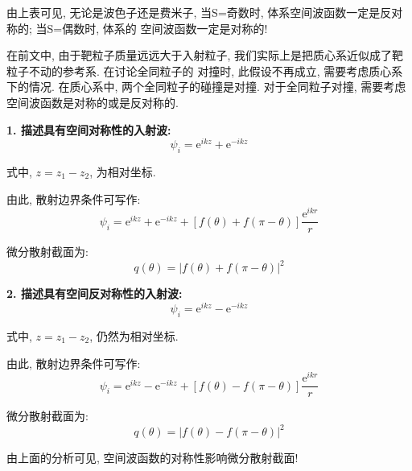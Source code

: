 \documentclass[a4paper, 11pt]{article}
\begin{document}
\begin{spacing}{1.2}
          由上表可见, 无论是波色子还是费米子, 当S=奇数时, 体系空间波函数一定是反对称的; 当S=偶数时, 体系的
          空间波函数一定是对称的!

          在前文中, 由于靶粒子质量远远大于入射粒子, 我们实际上是把质心系近似成了靶粒子不动的参考系. 在讨论全同粒子的
          对撞时, 此假设不再成立, 需要考虑质心系下的情况. 在质心系中, 两个全同粒子的碰撞是对撞. 对于全同粒子对撞, 
          需要考虑空间波函数是对称的或是反对称的. 

          \textbf{1. 描述具有空间对称性的入射波:}
          \begin{equation}
            \psi_i = \mathrm{e}^{ikz} + \mathrm{e}^{-ikz}
          \end{equation}

          式中, $z = z_1-z_2$, 为相对坐标.
          
          由此, 散射边界条件可写作:
          \begin{equation}
            \psi_i = \mathrm{e}^{ikz} + \mathrm{e}^{-ikz} + \left[f(\theta)+f(\pi-\theta)\right]%
                      \dfrac{\mathrm{e}^{ikr}}{r}
          \end{equation}

          微分散射截面为:
          \begin{equation}
            q(\theta) = |f(\theta)+f(\pi-\theta)|^2
          \end{equation}

          \textbf{2. 描述具有空间反对称性的入射波:}
          \begin{equation}
            \psi_i = \mathrm{e}^{ikz} - \mathrm{e}^{-ikz}
          \end{equation}

          式中, $z = z_1-z_2$, 仍然为相对坐标.
          
          由此, 散射边界条件可写作:
          \begin{equation}
            \psi_i = \mathrm{e}^{ikz} - \mathrm{e}^{-ikz} + \left[f(\theta)-f(\pi-\theta)\right]%
                      \dfrac{\mathrm{e}^{ikr}}{r}
          \end{equation}

          微分散射截面为:
          \begin{equation}
            q(\theta) = |f(\theta)-f(\pi-\theta)|^2
          \end{equation}

          由上面的分析可见, 空间波函数的对称性影响微分散射截面!


\end{spacing}
\end{document}
